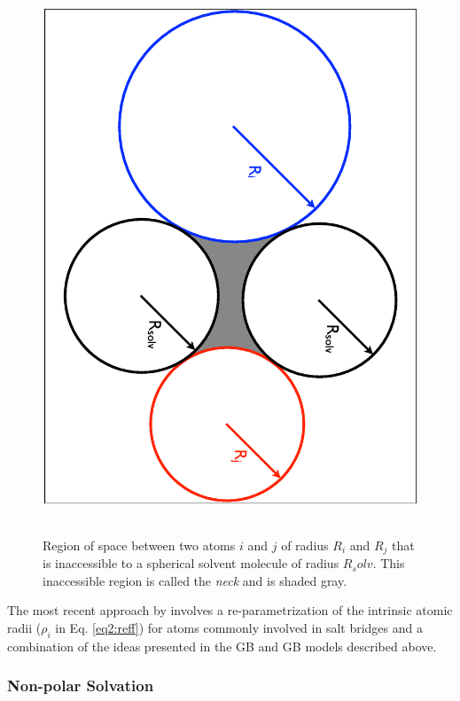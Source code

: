 \begin{figure}
   \includegraphics[height=6.5in, angle=90, trim=1cm 0.5cm 1cm 0.5cm, clip=true]
                   {Interstitial.ps}
   \caption{Region of space between two atoms $i$ and $j$ of radius $R_i$ and
            $R_j$ that is inaccessible to a spherical solvent molecule of radius
            $R_solv$. This inaccessible region is called the \emph{neck} and is
            shaded gray.}
   \label{fig2:Interstitial}
\end{figure}

The most recent approach by \citeauthor{Nguyen_JChemTheoryComput_2013_ASAP}
involves a re-parametrization of the intrinsic atomic radii ($\rho_i$ in Eq.
\ref{eq2:reff}) for atoms commonly involved in salt bridges and a combination of
the ideas presented in the GB and GB models described
above. \cite{Nguyen_JChemTheoryComput_2013_ASAP}

\subsubsection{Non-polar Solvation}

